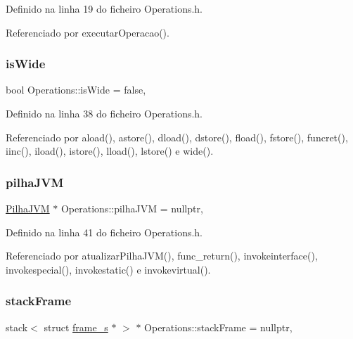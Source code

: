 Definido na linha 19 do ficheiro Operations.\+h.



Referenciado por executar\+Operacao().

\mbox{\label{classOperations_a672ba6cc2178cbc5b0a434b08de4c608}} 
\subsubsection{\texorpdfstring{is\+Wide}{isWide}}
{\footnotesize\ttfamily bool Operations\+::is\+Wide = false\hspace{0.3cm}{\ttfamily [static]}, {\ttfamily [private]}}



Definido na linha 38 do ficheiro Operations.\+h.



Referenciado por aload(), astore(), dload(), dstore(), fload(), fstore(), funcret(), iinc(), iload(), istore(), lload(), lstore() e wide().

\mbox{\label{classOperations_a1a7c399bf01fabfc223a3f84f7fcace0}} 
\subsubsection{\texorpdfstring{pilha\+J\+VM}{pilhaJVM}}
{\footnotesize\ttfamily \hyperlink{classPilhaJVM}{Pilha\+J\+VM} $\ast$ Operations\+::pilha\+J\+VM = nullptr\hspace{0.3cm}{\ttfamily [static]}, {\ttfamily [private]}}



Definido na linha 41 do ficheiro Operations.\+h.



Referenciado por atualizar\+Pilha\+J\+V\+M(), func\+\_\+return(), invokeinterface(), invokespecial(), invokestatic() e invokevirtual().

\mbox{\label{classOperations_ae813b6fad395a04f6cd8e0c355dc056d}} 
\subsubsection{\texorpdfstring{stack\+Frame}{stackFrame}}
{\footnotesize\ttfamily stack$<$ struct \hyperlink{structframe__s}{frame\+\_\+s} $\ast$ $>$ $\ast$ Operations\+::stack\+Frame = nullptr\hspace{0.3cm}{\ttfamily [static]}, {\ttfamily [private]}}



